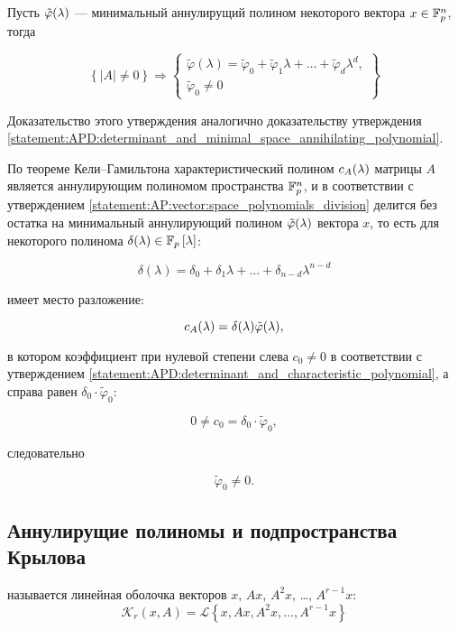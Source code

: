 \begin{statement} \label{statement:APD:determinant_and_minimal_vector_annihilating_polynomial}
	Пусть $\tilde\varphi (\lambda)$ --- минимальный аннулирущий полином некоторого вектора $x \in \mathbb{F}^{n}_p$, тогда

		$$
			\left \{
				\left | A \right | \neq 0
			\right \}
			\Rightarrow
			\left \{
				\begin{array}{c}
					\tilde\varphi(\lambda) = \tilde\varphi_0 + \tilde\varphi_1 \lambda + \dots + \tilde\varphi_d \lambda^d,\\
					\tilde\varphi_0 \neq 0
				\end{array}
			\right \}
		$$

	\proof

	Доказательство этого утверждения аналогично доказательству утверждения
	\ref{statement:APD:determinant_and_minimal_space_annihilating_polynomial}.

	По теореме Кели--Гамильтона \cite[с.~93]{Gantmacher} характеристический полином $c_A (\lambda)$ матрицы $A$ является аннулирующим
	полиномом пространства $\mathbb{F}^{n}_p$, и в соответствии с утверждением \ref{statement:AP:vector:space_polynomials_division} делится без
	остатка на минимальный аннулирующий полином $\tilde\varphi (\lambda)$ вектора $x$, то есть для некоторого полинома
	$\delta (\lambda) \in \mathbb{F}_p \left [ \lambda \right ]$:

		$$ \delta(\lambda) = \delta_0 + \delta_1 \lambda + \dots + \delta_{n-d} \lambda^{n-d} $$

	имеет место разложение:

		$$ c_A (\lambda) = \delta (\lambda) \tilde\varphi (\lambda), $$

	в котором коэффициент при нулевой степени слева $c_0 \neq 0$ в соответствии с утверждением
	\ref{statement:APD:determinant_and_characteristic_polynomial}, а справа равен $\delta_0 \cdot \tilde\varphi_0$:

		$$ 0 \neq c_0 = \delta_0 \cdot \tilde\varphi_0, $$

	следовательно

		$$ \tilde\varphi_0 \neq 0. $$
\end{statement}

\subsection{Аннулирущие полиномы и подпространства Крылова} \label{section:KS:krylov_spaces}

\begin{definition}
	называется линейная оболочка векторов $x$, $Ax$, $A^2x$, \dots, $A^{r-1}x$:
		$$ \mathcal K_r (x,A) = \mathcal L \left \{ x, Ax, A^2x, \dots, A^{r-1}x \right \} $$
\end{definition}

